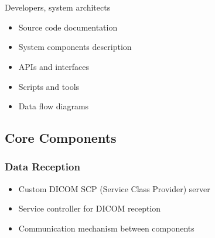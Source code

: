 \documentclass[letterpaper,10pt,english]{sphinxmanual}
\begin{document}
\sphinxstepscope


\section{}
\label{\detokenize{Temp/architecture-options:architecture-options}}\label{\detokenize{Temp/architecture-options::doc}}
\sphinxAtStartPar
{} Developers, system architects

\sphinxAtStartPar
{}
\begin{itemize}
\item {} 
\sphinxAtStartPar
Source code documentation

\item {} 
\sphinxAtStartPar
System components description

\item {} 
\sphinxAtStartPar
APIs and interfaces

\item {} 
\sphinxAtStartPar
Scripts and tools

\item {} 
\sphinxAtStartPar
Data flow diagrams

\end{itemize}


\subsection{Core Components}
\label{\detokenize{Temp/architecture-options:core-components}}

\subsubsection{Data Reception}
\label{\detokenize{Temp/architecture-options:data-reception}}\begin{itemize}
\item {} 
\sphinxAtStartPar
{} \sphinxhyphen{} Custom DICOM SCP (Service Class Provider) server

\item {} 
\sphinxAtStartPar
{} \sphinxhyphen{} Service controller for DICOM reception

\item {} 
\sphinxAtStartPar
{} \sphinxhyphen{} Communication mechanism between components

\end{itemize}
\end{document}
